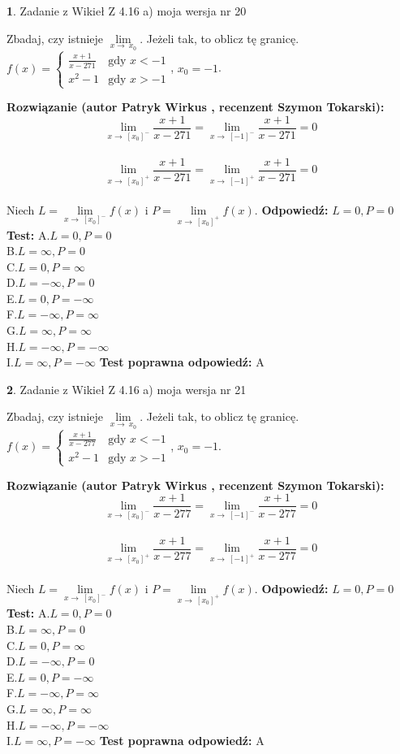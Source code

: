 \documentclass[12pt, a4paper]{article}
\theoremstyle{definition} %
\newtheorem{zad}{}
\newcommand{\zadStart}[1]{\begin{zad}#1\newline}
\newcommand{\zadStop}{\end{zad}}
\newcommand{\rozwStart}[2]{\noindent \textbf{Rozwiązanie (autor #1 , recenzent #2): }\newline}
\newcommand{\rozwStop}{\newline}
\newcommand{\odpStart}{\noindent \textbf{Odpowiedź:}\newline}
\newcommand{\odpStop}{\newline}
\newcommand{\testStart}{\noindent \textbf{Test:}\newline}
\newcommand{\testStop}{\newline}
\newcommand{\kluczStart}{\noindent \textbf{Test poprawna odpowiedź:}\newline}
\newcommand{\kluczStop}{\newline}
\begin{document}
\zadStart{Zadanie z Wikieł Z 4.16 a) moja wersja nr 20}

Zbadaj, czy istnieje $\lim\limits_{x\to\ x_{0}}$. Jeżeli tak, to oblicz tę granicę.\\   $f(x) = \left\{ \begin{array}{ll}
\frac{x+1}{x-271} & \textrm{gdy $x<-1$}\\
x^{2}-1 & \textrm{gdy $x>-1$}
\end{array} \right.$, $x_{0}=-1$.
\zadStop
\rozwStart{Patryk Wirkus}{Szymon Tokarski}
$$\lim\limits_{x\to\ [x_{0}]^{-}}\frac{x+1}{x-271} = \lim\limits_{x\to\ [-1]^{-}}\frac{x+1}{x-271} = 0$$
\\
$$\lim\limits_{x\to\ [x_{0}]^{+}}\frac{x+1}{x-271} = \lim\limits_{x\to\ [-1]^{+}}\frac{x+1}{x-271} = 0$$
\\
Niech $L=\lim\limits_{x\to\ [x_{0}]^{-}}f(x)$ i $P=\lim\limits_{x\to\ [x_{0}]^{+}}f(x)$.
\rozwStop
\odpStart
$L=0, P=0$
\odpStop
\testStart
A.$L=0, P=0$\\ B.$L=\infty, P=0$\\ C.$L=0, P=\infty$\\ D.$L=-\infty, P=0$\\ E.$L=0, P=-\infty$\\
F.$L=-\infty, P=\infty$\\ G.$L=\infty, P=\infty$\\
H.$L=-\infty, P=-\infty$\\
I.$L=\infty, P=-\infty$
\testStop
\kluczStart
A
\kluczStop



\zadStart{Zadanie z Wikieł Z 4.16 a) moja wersja nr 21}

Zbadaj, czy istnieje $\lim\limits_{x\to\ x_{0}}$. Jeżeli tak, to oblicz tę granicę.\\   $f(x) = \left\{ \begin{array}{ll}
\frac{x+1}{x-277} & \textrm{gdy $x<-1$}\\
x^{2}-1 & \textrm{gdy $x>-1$}
\end{array} \right.$, $x_{0}=-1$.
\zadStop
\rozwStart{Patryk Wirkus}{Szymon Tokarski}
$$\lim\limits_{x\to\ [x_{0}]^{-}}\frac{x+1}{x-277} = \lim\limits_{x\to\ [-1]^{-}}\frac{x+1}{x-277} = 0$$
\\
$$\lim\limits_{x\to\ [x_{0}]^{+}}\frac{x+1}{x-277} = \lim\limits_{x\to\ [-1]^{+}}\frac{x+1}{x-277} = 0$$
\\
Niech $L=\lim\limits_{x\to\ [x_{0}]^{-}}f(x)$ i $P=\lim\limits_{x\to\ [x_{0}]^{+}}f(x)$.
\rozwStop
\odpStart
$L=0, P=0$
\odpStop
\testStart
A.$L=0, P=0$\\ B.$L=\infty, P=0$\\ C.$L=0, P=\infty$\\ D.$L=-\infty, P=0$\\ E.$L=0, P=-\infty$\\
F.$L=-\infty, P=\infty$\\ G.$L=\infty, P=\infty$\\
H.$L=-\infty, P=-\infty$\\
I.$L=\infty, P=-\infty$
\testStop
\kluczStart
A
\kluczStop
\end{document}
